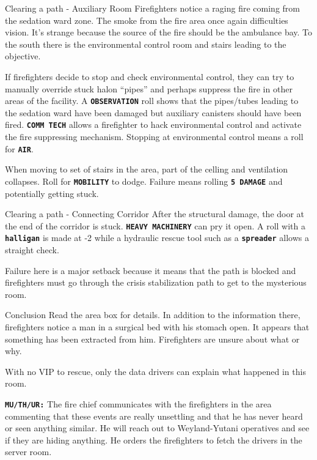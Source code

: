 \begin{rpg-commentbox}{Clearing a path - Auxiliary Room}
    Firefighters notice a raging fire coming from the sedation ward zone. The smoke from the fire area once again difficulties vision. 
    It's strange because the source of the fire should be the ambulance bay. To the south there is the environmental control room and stairs leading to the objective. 
    
    If firefighters decide to stop and check environmental control, they can try to manually override stuck halon ``pipes'' and perhaps suppress the fire in other areas of the facility. 
    A \texttt{\textbf{OBSERVATION}} roll shows that the pipes/tubes leading to the sedation ward have been damaged but auxiliary canisters should have been fired.
    \texttt{\textbf{COMM TECH}} allows a firefighter to hack environmental control and activate the fire suppressing mechanism. 
    Stopping at environmental control means a roll for \texttt{\textbf{AIR}}.


    When moving  to  set of stairs in the area, part of the celling and ventilation collapses. 
    Roll for \texttt{\textbf{MOBILITY}} to dodge. Failure means rolling 
    \texttt{\textbf{5 DAMAGE}} and potentially getting stuck.    
    
\end{rpg-commentbox}  



\begin{rpg-commentbox}{Clearing a path - Connecting Corridor}    
    After the structural damage, the door at the end of the corridor is stuck.
    \texttt{\textbf{HEAVY MACHINERY}} can pry it open. 
    A roll with a \texttt{\textbf{halligan}} is made at -2 while a hydraulic rescue tool such as a \texttt{\textbf{spreader}} allows a straight check.

    Failure here is a major setback because it means that the path is blocked and firefighters must go through the crisis stabilization path to get to the mysterious room. 
\end{rpg-commentbox}  


\newsect


\begin{rpg-commentbox}{Conclusion}
    Read the area box for details. In addition to the information there, firefighters notice a man in a surgical bed with his stomach open. It appears that something has been extracted from him. Firefighters are unsure about what or why. 

    With no VIP to rescue, only the data drivers can explain what happened in this room.
    
    \texttt{\textbf{MU/TH/UR:}} The fire chief communicates with the firefighters in the area commenting that these events are really unsettling and that he has never heard or seen anything similar. He will reach out to Weyland-Yutani operatives and see if they are hiding anything. He orders the firefighters to fetch the drivers in the server room.
\end{rpg-commentbox}  

